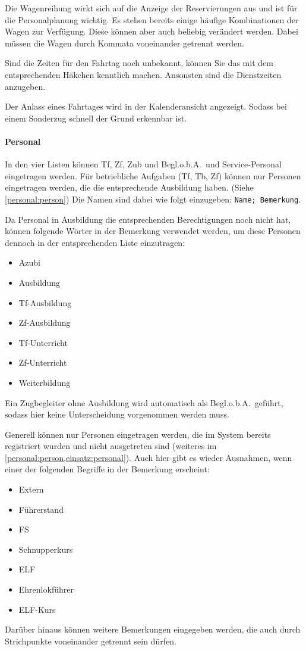 Die Wagenreihung wirkt sich auf die Anzeige der Reservierungen aus und ist für die Personalplanung wichtig.
Es stehen bereits einige häufige Kombinationen der Wagen zur Verfügung.
Diese können aber auch beliebig verändert werden.
Dabei müssen die Wagen durch Kommata voneinander getrennt werden.

Sind die Zeiten für den Fahrtag noch unbekannt, können Sie das mit dem entsprechenden Häkchen kenntlich machen.
Ansonsten sind die Dienstzeiten anzugeben.

Der Anlass eines Fahrtages wird in der Kalenderansicht angezeigt.
Sodass bei einem Sonderzug schnell der Grund erkennbar ist.

\paragraph{Personal}
In den vier Listen können Tf, Zf, Zub und Begl.o.b.A.\ und Service-Personal eingetragen werden.
Für betriebliche Aufgaben (Tf, Tb, Zf) können nur Personen eingetragen werden, die die entsprechende Ausbildung haben.
(Siehe \cref{personal:person})
Die Namen sind dabei wie folgt einzugeben: \texttt{Name; Bemerkung}.

Da Personal in Ausbildung die entsprechenden Berechtigungen noch nicht hat, können folgende Wörter in der Bemerkung verwendet werden, um diese Personen dennoch in der entsprechenden Liste einzutragen:
\begin{itemize}
	\item Azubi
	\item Ausbildung
	\item Tf-Ausbildung
	\item Zf-Ausbildung
	\item Tf-Unterricht
	\item Zf-Unterricht
	\item Weiterbildung
\end{itemize}
Ein Zugbegleiter ohne Ausbildung wird automatisch als Begl.o.b.A.\ geführt, sodass hier keine Unterscheidung vorgenommen werden muss.

Generell können nur Personen eingetragen werden, die im System bereits registriert wurden und nicht ausgetreten sind
(weiteres im \cref{personal:person,einsatz:personal}).
Auch hier gibt es wieder Ausnahmen, wenn einer der folgenden Begriffe in der Bemerkung erscheint:
\begin{itemize}
	\item Extern
	\item Führerstand
	\item FS
	\item Schnupperkurs
	\item ELF
	\item Ehrenlokführer
	\item ELF-Kurs
\end{itemize}
Darüber hinaus können weitere Bemerkungen eingegeben werden, die auch durch Strichpunkte voneinander getrennt sein dürfen.

